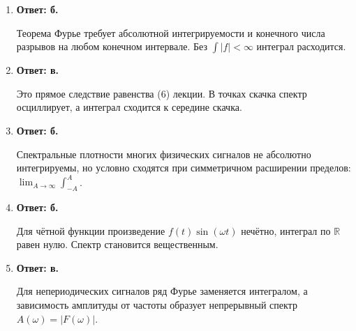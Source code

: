 \documentclass[12pt,a4paper]{article}
\begin{document}
\begin{enumerate}[label=\textbf{1.\arabic*.}]
    \item \textbf{Ответ: б.} \begin{applink}Теорема Фурье требует абсолютной интегрируемости и конечного числа разрывов на любом конечном интервале. Без $\int |f| < \infty$ интеграл расходится.\end{applink}
    \item \textbf{Ответ: в.} \begin{applink}Это прямое следствие равенства (6) лекции. В точках скачка спектр осциллирует, а интеграл сходится к середине скачка.\end{applink}
    \item \textbf{Ответ: б.} \begin{applink}Спектральные плотности многих физических сигналов не абсолютно интегрируемы, но условно сходятся при симметричном расширении пределов: $\lim_{A\to\infty}\int_{-A}^{A}$.\end{applink}
    \item \textbf{Ответ: б.} \begin{applink}Для чётной функции произведение $f(t)\sin(\omega t)$ нечётно, интеграл по $\mathbb{R}$ равен нулю. Спектр становится вещественным.\end{applink}
    \item \textbf{Ответ: в.} \begin{applink}Для непериодических сигналов ряд Фурье заменяется интегралом, а зависимость амплитуды от частоты образует непрерывный спектр $A(\omega)=|F(\omega)|$.\end{applink}
\end{enumerate}
\end{document}

